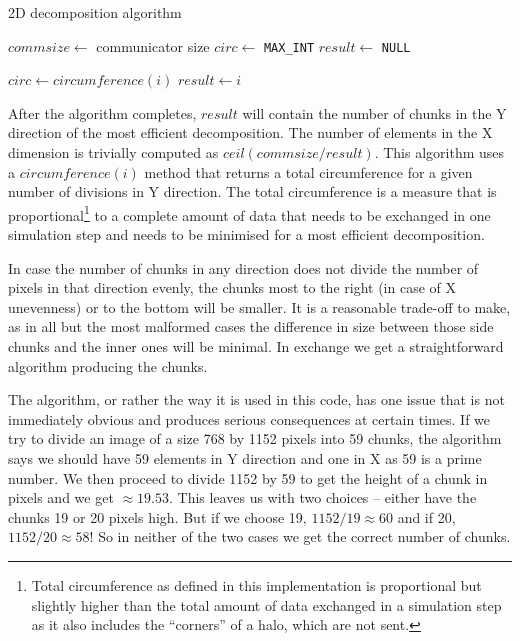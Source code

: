 \documentclass[11pt,a4paper]{article}
\begin{document}
\begin{algorithm}
    \caption{2D decomposition algorithm}\label{2dcomp}
    \begin{algorithmic}[1]
        \State $commsize\gets$ communicator size
        \State $circ\gets$ \texttt{MAX\_INT}
        \State $result\gets$ \texttt{NULL}

                \State $circ\gets circumference(i)$
                \State $result\gets i$
            \EndIf
        \EndFor
    \end{algorithmic}
\end{algorithm}

After the algorithm completes, $result$ will contain the number of chunks in the Y direction of the most efficient decomposition. 
The number of elements in the X dimension is trivially computed as $ceil(commsize / result)$. 
This algorithm uses a $circumference(i)$ method that returns a total circumference for a given number of divisions in Y direction. 
The total circumference is a measure that is proportional\footnote{Total circumference as defined in this implementation is proportional but slightly higher than the total amount of data exchanged in a simulation step as it also includes the ``corners'' of a halo, which are not sent.} to a complete amount of data that needs to be exchanged in one simulation step and needs to be minimised for a most efficient decomposition. 

In case the number of chunks in any direction does not divide the number of pixels in that direction evenly, the chunks most to the right (in case of X unevenness) or to the bottom will be smaller. 
It is a reasonable trade-off to make, as in all but the most malformed cases the difference in size between those side chunks and the inner ones will be minimal. 
In exchange we get a straightforward algorithm producing the chunks.

The algorithm, or rather the way it is used in this code, has one issue that is not immediately obvious and produces serious consequences at certain times. 
If we try to divide an image of a size 768 by 1152 pixels into 59 chunks, the algorithm says we should have 59 elements in Y direction and one in X as 59 is a prime number. 
We then proceed to divide 1152 by 59 to get the height of a chunk in pixels and we get $\approx 19.53$. 
This leaves us with two choices -- either have the chunks 19 or 20 pixels high. But if we choose 19, $1152 / 19\approx 60$ and if 20, $1152 / 20\approx 58$! So in neither of the two cases we get the correct number of chunks.
\end{document}
